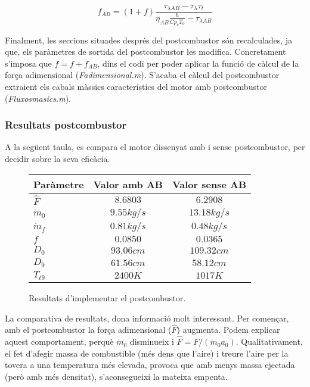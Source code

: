 \begin{equation}
	f_{AB}=(1+f)\frac{\tau_{\lambda AB}-\tau_{\lambda}\tau_t}{\eta_{AB}\frac{h}{Cp_cT_0}-\tau_{\lambda AB}}
\end{equation}
 
 
\noindent Finalment, les seccions situades després del postcombustor són recalculades, ja que, els paràmetres de sortida del postcombustor les modifica. Concretament s'imposa que $f = f +f_{AB}$, dins el codi per poder aplicar la funció de càlcul de la força adimensional (\textit{Fadimensional.m}). S'acaba el càlcul del postcombustor extraient els cabals màssics característics del motor amb postcombustor (\textit{Fluxosmasics.m}).

\subsubsection{Resultats postcombustor}
A la següent taula, es compara el motor dissenyat amb i sense postcombustor, per decidir sobre la seva eficàcia.
\begin{figure}[H]
	\centering
	\begin{tabular}{lcc}
		\toprule[3pt]
		\textbf{Paràmetre}&\textbf{Valor amb AB}&\textbf{Valor sense AB}\\
		\midrule[1pt]
		$\hat{F}$ & $8.6803$ & $6.2908$\\
		$ \dot{m}_0$ & $9.55kg/s$ & $13.18kg/s$\\
		$ \dot{m}_f$ & $0.81kg/s$ & $0.48kg/s$\\
		$ f$ & $0.0850$ & $0.0365$\\
		$D_0$ & $93.06cm$ & $109.32cm$\\
		$D_9$ & $61.56cm$ & $58.12cm$\\
		$T_{t9}$ & $2400K$ & $1017K$\\
		
		\bottomrule[2pt]
	\end{tabular}
	\label{ABres}
	\caption{Resultats d'implementar el postcombustor.}
\end{figure}

\noindent La comparativa de resultats, dona informació molt interessant. Per començar, amb el postcombustor la força adimensional ($\hat{F}$)  augmenta. Podem explicar aquest comportament, perquè $ \dot{m}_0$ disminueix i $\hat{F}=F/(\dot{m}_0a_0)$. Qualitativament, el fet d'afegir massa de combustible (més dens que l'aire) i treure l'aire per la tovera a una temperatura més elevada, provoca que amb menys massa ejectada (però amb més densitat), s'aconsegueixi la mateixa empenta.

